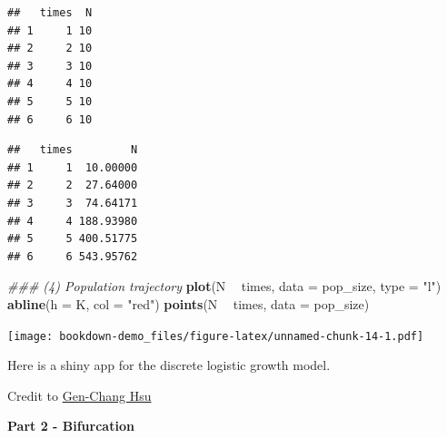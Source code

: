 \documentclass[
]{book}
\newenvironment{Shaded}{\begin{snugshade}}{\end{snugshade}}
\newcommand{\CommentTok}[1]{\textcolor[rgb]{0.56,0.35,0.01}{\textit{#1}}}
\newcommand{\ControlFlowTok}[1]{\textcolor[rgb]{0.13,0.29,0.53}{\textbf{#1}}}
\newcommand{\DataTypeTok}[1]{\textcolor[rgb]{0.13,0.29,0.53}{#1}}
\newcommand{\DecValTok}[1]{\textcolor[rgb]{0.00,0.00,0.81}{#1}}
\newcommand{\KeywordTok}[1]{\textcolor[rgb]{0.13,0.29,0.53}{\textbf{#1}}}
\newcommand{\NormalTok}[1]{#1}
\newcommand{\OperatorTok}[1]{\textcolor[rgb]{0.81,0.36,0.00}{\textbf{#1}}}
\newcommand{\StringTok}[1]{\textcolor[rgb]{0.31,0.60,0.02}{#1}}
\begin{document}
\begin{verbatim}
##   times  N
## 1     1 10
## 2     2 10
## 3     3 10
## 4     4 10
## 5     5 10
## 6     6 10
\end{verbatim}

\begin{Shaded}
\end{Shaded}

\begin{verbatim}
##   times         N
## 1     1  10.00000
## 2     2  27.64000
## 3     3  74.64171
## 4     4 188.93980
## 5     5 400.51775
## 6     6 543.95762
\end{verbatim}

\begin{Shaded}
\begin{Highlighting}[]
\CommentTok{### (4) Population trajectory}
\KeywordTok{plot}\NormalTok{(N }\OperatorTok{~}\StringTok{ }\NormalTok{times, }\DataTypeTok{data =}\NormalTok{ pop_size, }\DataTypeTok{type =} \StringTok{"l"}\NormalTok{)}
\KeywordTok{abline}\NormalTok{(}\DataTypeTok{h =}\NormalTok{ K, }\DataTypeTok{col =} \StringTok{"red"}\NormalTok{)}
\KeywordTok{points}\NormalTok{(N }\OperatorTok{~}\StringTok{ }\NormalTok{times, }\DataTypeTok{data =}\NormalTok{ pop_size)}
\end{Highlighting}
\end{Shaded}

\texttt{[image: bookdown-demo\_files/figure-latex/unnamed-chunk-14-1.pdf]}

Here is a shiny app for the discrete logistic growth model.

Credit to \href{https://genchanghsu.github.io/index.html}{Gen-Chang Hsu}

\textbf{Part 2 - Bifurcation}
\end{document}
